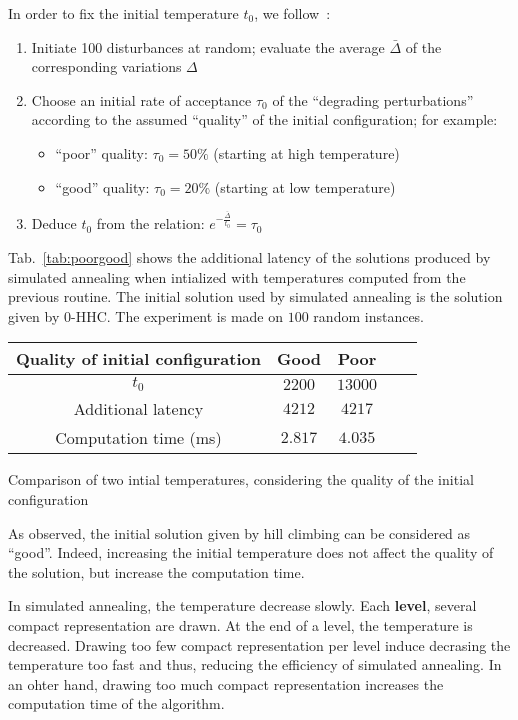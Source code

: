  In order to fix the initial temperature $t_0$, we follow~\cite{osman1997meta}:
 \begin{enumerate}
  \item Initiate 100 disturbances at random; evaluate the average $\bar{\Delta}$ of the corresponding variations $\Delta$
\item Choose an initial rate of acceptance $\tau_0$ of the “degrading perturbations” according to the assumed “quality” of the initial configuration; for example:
\begin{itemize}
 \item “poor” quality: $\tau_0 = 50 \%$ (starting at high temperature)
\item “good” quality: $\tau_0 = 20 \%$ (starting at low temperature)
\end{itemize}


\item Deduce $t_0$ from the relation: $e^{-\frac{\bar{\Delta}}{t_0}} = \tau_0$ 
 \end{enumerate}
 
 Tab.~\ref{tab:poorgood} shows the additional latency of the solutions produced by simulated annealing when intialized with temperatures computed from the previous routine. The initial solution used by simulated annealing is the solution given by $0$-HHC. The experiment is made on $100$ random instances.
\begin{center}
\begin{tabular}{ |c|c|c|c|c| }
\hline
 Quality of initial configuration & Good& Poor\\
    \hline
    $t_0$ & $2200$& $13000$\\
    \hline
    Additional latency & $4212$ & $4217$ \\
        \hline
    Computation time (ms) &  $2.817$&$4.035$ \\

    \hline
    
 \end{tabular}
 \caption{Comparison of two intial temperatures, considering the quality of the initial configuration}
     \label{tab:poorgood}
 \end{center}
 As observed, the initial solution given by hill climbing can be considered as ``good''. Indeed, increasing the initial temperature does not affect the quality of the solution, but increase the computation time.
 
 In simulated annealing, the temperature decrease slowly. Each \textbf{level}, several compact representation are drawn. At the end of a level, the temperature is decreased. Drawing too few compact representation per level induce decrasing the temperature too fast and thus, reducing the efficiency of simulated annealing. In an ohter hand, drawing too much compact representation increases the computation time of the algorithm.
  
